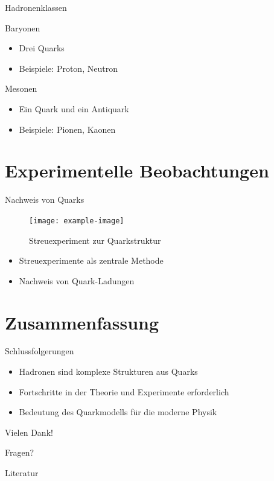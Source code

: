 \documentclass[aspectratio=169]{beamer} %
\begin{document}
    \begin{frame}{Hadronenklassen}
        \begin{block}{Baryonen}
            \begin{itemize}
                \item Drei Quarks
                \item Beispiele: Proton, Neutron
            \end{itemize}
        \end{block}
        \begin{block}{Mesonen}
            \begin{itemize}
                \item Ein Quark und ein Antiquark
                \item Beispiele: Pionen, Kaonen
            \end{itemize}
        \end{block}
    \end{frame}
    
    \section{Experimentelle Beobachtungen}
    \begin{frame}{Nachweis von Quarks}
        \begin{figure}
            \centering
            \texttt{[image: example-image]} %
            \caption{Streuexperiment zur Quarkstruktur}
        \end{figure}
        \begin{itemize}
            \item Streuexperimente als zentrale Methode
            \item Nachweis von Quark-Ladungen
        \end{itemize}
    \end{frame}
    
    \section{Zusammenfassung}
    \begin{frame}{Schlussfolgerungen}
        \begin{itemize}
            \item Hadronen sind komplexe Strukturen aus Quarks
            \item Fortschritte in der Theorie und Experimente erforderlich
            \item Bedeutung des Quarkmodells für die moderne Physik
        \end{itemize}
    \end{frame}
    
    \begin{frame}{Vielen Dank!}
        \begin{center}
            \Huge Fragen?
        \end{center}
    \end{frame}
    
    \begin{frame}[allowframebreaks]{Literatur}
        \printbibliography
    \end{frame}
    
\end{document}
